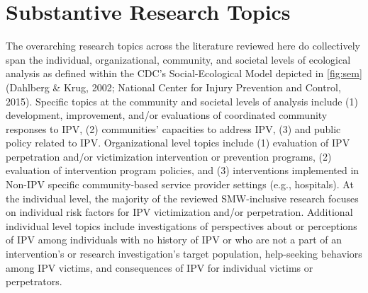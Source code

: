 \documentclass[11pt,]{tufte-book}
\begin{document}
\section{Substantive Research Topics}\label{substantive-research-topics}

The overarching research topics across the literature reviewed here do
collectively span the individual, organizational, community, and
societal levels of ecological analysis as defined within the CDC's
Social-Ecological Model depicted in \cref{fig:sem}
(Dahlberg \& Krug, 2002; National Center for Injury Prevention and
Control, 2015). Specific topics at the community and societal levels of
analysis include (1) development, improvement, and/or evaluations of
coordinated community responses to IPV, (2) communities' capacities to
address IPV, (3) and public policy related to IPV. Organizational level
topics include (1) evaluation of IPV perpetration and/or victimization
intervention or prevention programs, (2) evaluation of intervention
program policies, and (3) interventions implemented in Non-IPV specific
community-based service provider settings (e.g., hospitals). At the
individual level, the majority of the reviewed SMW-inclusive research
focuses on individual risk factors for IPV victimization and/or
perpetration. Additional individual level topics include investigations
of perspectives about or perceptions of IPV among individuals with no
history of IPV or who are not a part of an intervention's or research
investigation's target population, help-seeking behaviors among IPV
victims, and consequences of IPV for individual victims or perpetrators.
\end{document}
